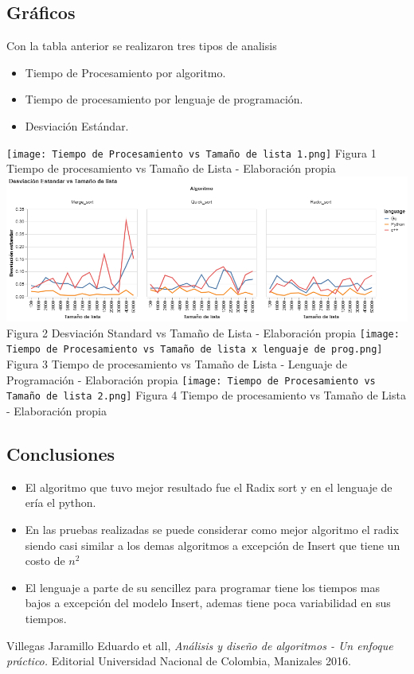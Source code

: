 \documentclass{article}
\begin{document}
\subsection{Gráficos}
Con la tabla anterior se realizaron tres tipos de analisis
\singlespacing\begin{itemize}
  \item  Tiempo de Procesamiento por algoritmo.
  \item Tiempo de procesamiento por lenguaje de programación.
  \item Desviación Estándar.
\end{itemize}
\center\texttt{[image: Tiempo de Procesamiento vs Tamaño de lista 1.png]}
\center Figura 1 Tiempo de procesamiento vs Tamaño de Lista - Elaboración propia
\center\includegraphics[trim={0.1cm 0.2cm 0cm 0.6cm},clip,scale=0.5]{SDvsTL.png}
\center Figura 2 Desviación Standard vs Tamaño de Lista - Elaboración propia
\center\texttt{[image: Tiempo de Procesamiento vs Tamaño de lista x lenguaje de prog.png]}
\center Figura 3 Tiempo de procesamiento vs Tamaño de Lista - Lenguaje de Programación - Elaboración propia
\center\texttt{[image: Tiempo de Procesamiento vs Tamaño de lista 2.png]}
\center Figura 4 Tiempo de procesamiento vs Tamaño de Lista - Elaboración propia
\newpage\
\pagestyle{fancy}
\fancyhf{}
\rfoot{\thepage}{}
\begin{flushleft}
\section{Conclusiones}
\end{flushleft}
\doublespacing\begin{itemize}
  \item El algoritmo que tuvo mejor resultado fue el Radix sort y en el lenguaje de ería el python.
  \item En las pruebas realizadas se puede considerar como mejor algoritmo el radix siendo casi similar a los demas algoritmos a excepción de Insert que tiene un costo de $n^2$
  \item El lenguaje a parte de su sencillez para programar tiene los tiempos mas bajos a excepción del modelo Insert, ademas tiene poca variabilidad en sus tiempos. 

\end{itemize}
\newpage{}\renewcommand{\footrulewidth}{1pt}
\pagestyle{plain}
\begin{thebibliography}{99}
    Villegas Jaramillo Eduardo et all, {\it Análisis y diseño de algoritmos - Un enfoque práctico.} Editorial Universidad Nacional de Colombia, Manizales 2016.
\end{thebibliography}
\end{document}
